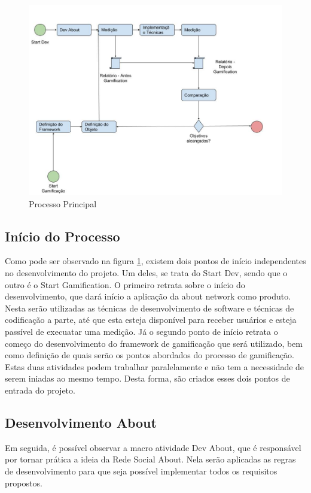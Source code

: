 \begin{figure}[h]
    \centering
    \includegraphics[width=450px, scale=1]{figuras/mainprocess}
    \caption{Processo Principal}
    \label{fig:mainprocess}
\end{figure}

\subsection{Início do Processo}
\label{sub:initialprocess}
Como pode ser observado na figura \ref{fig:mainprocess}, existem dois pontos
de início independentes no desenvolvimento do projeto. Um deles, se trata do
Start Dev, sendo que o outro é o Start Gamification. O primeiro retrata sobre
o início do desenvolvimento, que dará início a aplicação da about network
como produto. Nesta serão utilizadas as técnicas de desenvolvimento de software
e técnicas de codificação a parte, até que esta esteja disponível para receber
usuários e esteja passível de execuatar uma medição. Já o segundo ponto de início
retrata o começo do desenvolvimento do framework de gamificação que será utilizado,
bem como definição de quais serão os pontos abordados do processo de gamificação.
Estas duas atividades podem trabalhar paralelamente e não tem a necessidade de
serem iniadas ao mesmo tempo. Desta forma, são criados esses dois pontos de
entrada do projeto.

\subsection{Desenvolvimento About}
\label{sub:Desenvolvimentoabout}
Em seguida, é possível observar a macro atividade Dev About, que é responsável
por tornar prática a ideia da Rede Social About. Nela serão aplicadas as
regras de desenvolvimento para que seja possível implementar todos os
requisitos propostos.

